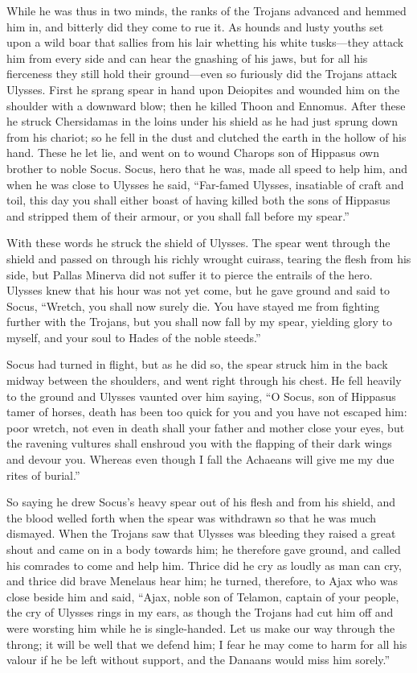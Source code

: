 While he was thus in two minds, the ranks of the Trojans advanced and
hemmed him in, and bitterly did they come to rue it. As hounds and lusty
youths set upon a wild boar that sallies from his lair whetting his white
tusks—they attack him from every side and can hear the gnashing of
his jaws, but for all his fierceness they still hold their ground—even
so furiously did the Trojans attack Ulysses. First he sprang spear in hand
upon Deiopites and wounded him on the shoulder with a downward blow; then
he killed Thoon and Ennomus. After these he struck Chersidamas in the
loins under his shield as he had just sprung down from his chariot; so he
fell in the dust and clutched the earth in the hollow of his hand. These
he let lie, and went on to wound Charops son of Hippasus own brother to
noble Socus. Socus, hero that he was, made all speed to help him, and when
he was close to Ulysses he said, “Far-famed Ulysses, insatiable of craft
and toil, this day you shall either boast of having killed both the sons
of Hippasus and stripped them of their armour, or you shall fall before my
spear.”

With these words he struck the shield of Ulysses. The spear went through
the shield and passed on through his richly wrought cuirass, tearing the
flesh from his side, but Pallas Minerva did not suffer it to pierce the
entrails of the hero. Ulysses knew that his hour was not yet come, but he
gave ground and said to Socus, “Wretch, you shall now surely die. You have
stayed me from fighting further with the Trojans, but you shall now fall
by my spear, yielding glory to myself, and your soul to Hades of the noble
steeds.”

Socus had turned in flight, but as he did so, the spear struck him in the
back midway between the shoulders, and went right through his chest. He
fell heavily to the ground and Ulysses vaunted over him saying, “O Socus,
son of Hippasus tamer of horses, death has been too quick for you and you
have not escaped him: poor wretch, not even in death shall your father and
mother close your eyes, but the ravening vultures shall enshroud you with
the flapping of their dark wings and devour you. Whereas even though I
fall the Achaeans will give me my due rites of burial.”

So saying he drew Socus’s heavy spear out of his flesh and from his
shield, and the blood welled forth when the spear was withdrawn so that he
was much dismayed. When the Trojans saw that Ulysses was bleeding they
raised a great shout and came on in a body towards him; he therefore gave
ground, and called his comrades to come and help him. Thrice did he cry as
loudly as man can cry, and thrice did brave Menelaus hear him; he turned,
therefore, to Ajax who was close beside him and said, “Ajax, noble son of
Telamon, captain of your people, the cry of Ulysses rings in my ears, as
though the Trojans had cut him off and were worsting him while he is
single-handed. Let us make our way through the throng; it will be well
that we defend him; I fear he may come to harm for all his valour if he be
left without support, and the Danaans would miss him sorely.”

